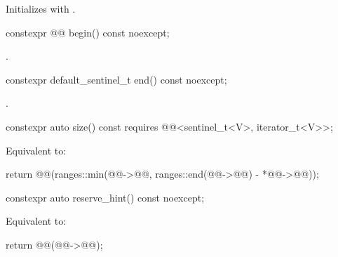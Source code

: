 \begin{itemdescr}
\pnum
\effects
Initializes  with .
\end{itemdescr}

%
\begin{itemdecl}
constexpr @@ begin() const noexcept;
\end{itemdecl}

\begin{itemdescr}
\pnum
\returns
{}.
\end{itemdescr}

%
\begin{itemdecl}
constexpr default_sentinel_t end() const noexcept;
\end{itemdecl}

\begin{itemdescr}
\pnum
\returns
{}.
\end{itemdescr}

%
\begin{itemdecl}
constexpr auto size() const
  requires @@<sentinel_t<V>, iterator_t<V>>;
\end{itemdecl}

\begin{itemdescr}
\pnum
\effects
Equivalent to:
\begin{codeblock}
return @@(ranges::min(@@->@@,
	                            ranges::end(@@->@@) - *@@->@@));
\end{codeblock}
\end{itemdescr}

%
\begin{itemdecl}
constexpr auto reserve_hint() const noexcept;
\end{itemdecl}

\begin{itemdescr}
\pnum
\effects
Equivalent to:
\begin{codeblock}
return @@(@@->@@);
\end{codeblock}
\end{itemdescr}

